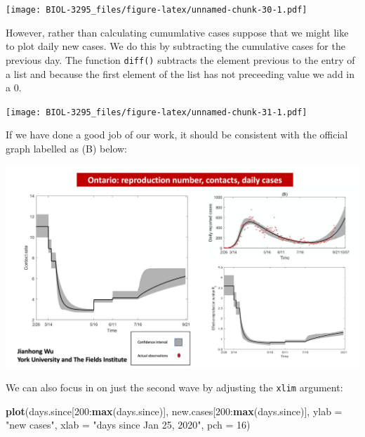 \documentclass[]{book}
\newenvironment{Shaded}{\begin{snugshade}}{\end{snugshade}}
\newcommand{\KeywordTok}[1]{\textcolor[rgb]{0.13,0.29,0.53}{\textbf{{#1}}}}
\newcommand{\DataTypeTok}[1]{\textcolor[rgb]{0.13,0.29,0.53}{{#1}}}
\newcommand{\DecValTok}[1]{\textcolor[rgb]{0.00,0.00,0.81}{{#1}}}
\newcommand{\StringTok}[1]{\textcolor[rgb]{0.31,0.60,0.02}{{#1}}}
\newcommand{\NormalTok}[1]{{#1}}
\begin{document}
\texttt{[image: BIOL-3295\_files/figure-latex/unnamed-chunk-30-1.pdf]}

However, rather than calculating cumumlative cases suppose that we might
like to plot daily new cases. We do this by subtracting the cumulative
cases for the previous day. The function \texttt{diff()} subtracts the
element previous to the entry of a list and because the first element of
the list has not preceeding value we add in a 0.

\begin{Shaded}
\end{Shaded}

\texttt{[image: BIOL-3295\_files/figure-latex/unnamed-chunk-31-1.pdf]}

If we have done a good job of our work, it should be consistent with the
official graph labelled as (B) below:

\includegraphics[width=1.2\linewidth]{figures/ONData}

We can also focus in on just the second wave by adjusting the
\texttt{xlim} argument:

\begin{Shaded}
\begin{Highlighting}[]
\KeywordTok{plot}\NormalTok{(days.since[}\DecValTok{200}\NormalTok{:}\KeywordTok{max}\NormalTok{(days.since)], new.cases[}\DecValTok{200}\NormalTok{:}\KeywordTok{max}\NormalTok{(days.since)], }\DataTypeTok{ylab =} \StringTok{"new cases"}\NormalTok{, }\DataTypeTok{xlab =} \StringTok{"days since Jan 25, 2020"}\NormalTok{, }\DataTypeTok{pch =} \DecValTok{16}\NormalTok{)}
\end{Highlighting}
\end{Shaded}
\end{document}
